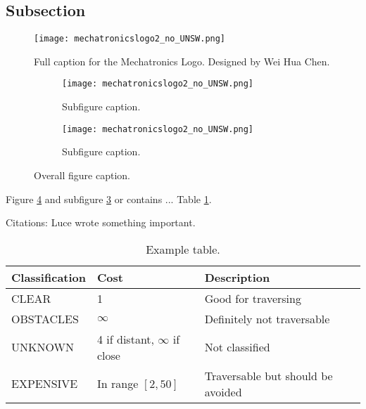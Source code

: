 \subsection{Subsection}

\begin{figure}
\centering
\texttt{[image: mechatronicslogo2\_no\_UNSW.png]}
\caption[Short caption for list of figures.]{Full caption for the Mechatronics Logo. Designed by Wei Hua Chen.}
\label{fig:intro_logo}
\end{figure}

\begin{figure}[!ht] \centering
\captionsetup[subfigure]{width=2.5in} %
\begin{subfigure}[t]{0.45\textwidth}
\texttt{[image: mechatronicslogo2\_no\_UNSW.png]}
\caption[Subfigure caption.]{Subfigure caption.}
\label{fig:intro_subfig1}
\end{subfigure}
\begin{subfigure}[t]{0.45\textwidth}
\texttt{[image: mechatronicslogo2\_no\_UNSW.png]}
\caption[Subfigure caption.]{Subfigure caption.}
\label{fig:intro_subfig2}
\end{subfigure}
\caption[Abbreviated caption.]{Overall figure caption.}
\label{fig:intro_subfig}
\end{figure}

Figure \ref{fig:intro_subfig} and subfigure \ref{fig:intro_subfig2} or  contains ...
Table \ref{tab:intro_table_1}. 

Citations: Luce \cite{luce_probabilistic_1958} wrote something important.


\begin{table}[h!]
\begin{center}
\begin{tabular}{ p{3cm}  p{4cm} | p{6.5cm} }
\hline
Classification & Cost & Description\\ \hline \hline
CLEAR & 1 & Good for traversing\\ \hline
OBSTACLES  & $\infty$ & Definitely not traversable\\ \hline
UNKNOWN & 4 if distant, $\infty$ if close & Not classified\\ \hline
EXPENSIVE & In range $[2, 50]$ & Traversable but should be avoided\\ \hline
\end{tabular}
\end{center}
\caption[Example table (short caption).]{Example table.}
\label{tab:intro_table_1}
\end{table}





